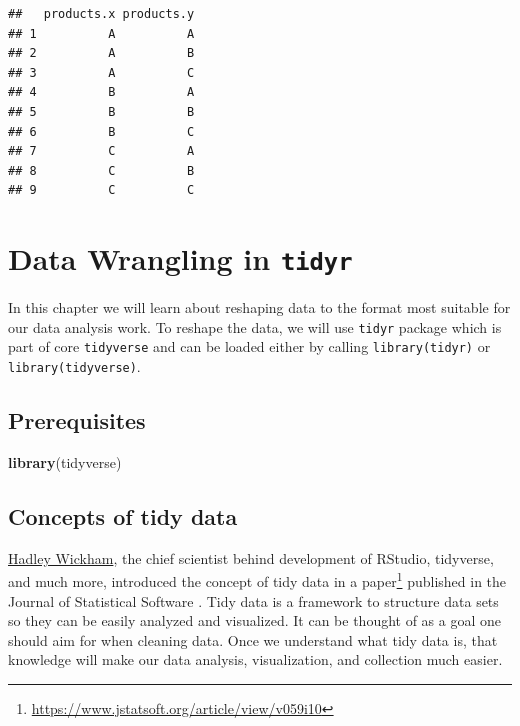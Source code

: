 \documentclass[
]{book}
\newenvironment{Shaded}{\begin{snugshade}}{\end{snugshade}}
\newcommand{\FunctionTok}[1]{\textcolor[rgb]{0.13,0.29,0.53}{\textbf{#1}}}
\newcommand{\NormalTok}[1]{#1}
\begin{document}
\begin{verbatim}
##   products.x products.y
## 1          A          A
## 2          A          B
## 3          A          C
## 4          B          A
## 5          B          B
## 6          B          C
## 7          C          A
## 8          C          B
## 9          C          C
\end{verbatim}

\hypertarget{data-wrangling-in-tidyr}{%
\chapter{\texorpdfstring{Data Wrangling in \texttt{tidyr}}{Data Wrangling in tidyr}}\label{data-wrangling-in-tidyr}}

In this chapter we will learn about reshaping data to the format most suitable for our data analysis work. To reshape the data, we will use \texttt{tidyr} package \citep{R-tidyr} which is part of core \texttt{tidyverse} and can be loaded either by calling \texttt{library(tidyr)} or \texttt{library(tidyverse)}.

\hypertarget{prerequisites-2}{%
\section{Prerequisites}\label{prerequisites-2}}

\begin{Shaded}
\begin{Highlighting}[]
\FunctionTok{library}\NormalTok{(tidyverse)}
\end{Highlighting}
\end{Shaded}

\hypertarget{concepts-of-tidy-data}{%
\section{Concepts of tidy data}\label{concepts-of-tidy-data}}

\href{https://hadley.nz/}{Hadley Wickham}, the chief scientist behind development of RStudio, tidyverse, and much more, introduced the concept of tidy data in a paper\footnote{\url{https://www.jstatsoft.org/article/view/v059i10}} published in the Journal of Statistical Software \citep{JSSv059i10}. Tidy data is a framework to structure data sets so they can be easily analyzed and visualized. It can be thought of as a goal one should aim for when cleaning data. Once we understand what tidy data is, that knowledge will make our data analysis, visualization, and collection much easier. \citep{JSSv021i12}
\end{document}
